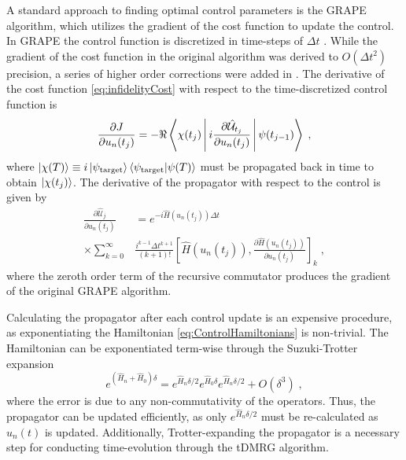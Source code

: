 \documentclass[%
 reprint,
 amsmath,amssymb,
 aps,
pra,
]{revtex4-1}
\begin{document}
A standard approach to finding optimal control parameters is the GRAPE algorithm, which utilizes the gradient of the cost function to update the control. In GRAPE the control function is discretized in time-steps of  $\Delta t$ \cite{khaneja2005optimal}. While the gradient of the cost function in the original algorithm was derived to $O(\Delta t ^2)$ precision, a series of higher order corrections were added in \cite{de2011second}. The derivative of the cost function \eqref{eq:infidelityCost} with respect to the time-discretized control function is
\begin{equation}
	\frac{\partial J}{\partial u_n (t_j)}  = - \Re \Braket{\chi (t_j) | i  \frac{\partial \hat{\mathcal{U}}_{t_j}}{\partial u_n (t_j)} | \psi (t_{j-1})} \; , \label{eq:CostDeriv}
\end{equation}
where $\ket{\chi (T)} \equiv i \ket{\psi_{\mathrm{target}}} \braket{\psi_{\mathrm{target}} | \psi (T)}$ must be propagated back in time to obtain $\ket{\chi (t_j)}$.
The derivative of the propagator with respect to the control is given by
\begin{align}
	\frac{\partial \hat{\mathcal{U}}_{j}}{\partial u_n (t_j)} &= e^{-i \hat{H} (u_n (t_j)) \Delta t} \nonumber \\ 
	 \times \sum_{k = 0}^{\infty } &  \frac{i^{k-1} \Delta t^{k+1}}{(k+1)!} \left[ \hat{H} (u_n (t_j)) , \frac{\partial \hat{H} (u_n (t_j))}{\partial u_n (t_j)}  \right]_k \; , \label{eq:PropDeriv}
\end{align}
where the zeroth order term of the recursive commutator produces the gradient of the original GRAPE algorithm.

Calculating the propagator after each control update is an expensive procedure, as exponentiating the Hamiltonian \eqref{eq:ControlHamiltonians} is non-trivial. The Hamiltonian can be exponentiated term-wise through the Suzuki-Trotter expansion
\begin{equation}
		e ^{( \hat{H}_n + \hat{H}_0  ) \delta } = e^{  \hat{H}_n \delta /2  } e^{ \hat{H}_0 \delta } e^{ \hat{H}_n \delta /2 } + O(\delta^3) \; , \label{eq:SuzukiTrotter}
\end{equation}
where the error is due to any non-commutativity of the operators.
Thus, the propagator can be updated efficiently, as only $e^{ \hat{H}_n \delta /2 }$ must be re-calculated as $u_n (t)$ is updated. Additionally, Trotter-expanding the propagator is a necessary step for conducting time-evolution through the tDMRG algorithm. 
\end{document}
